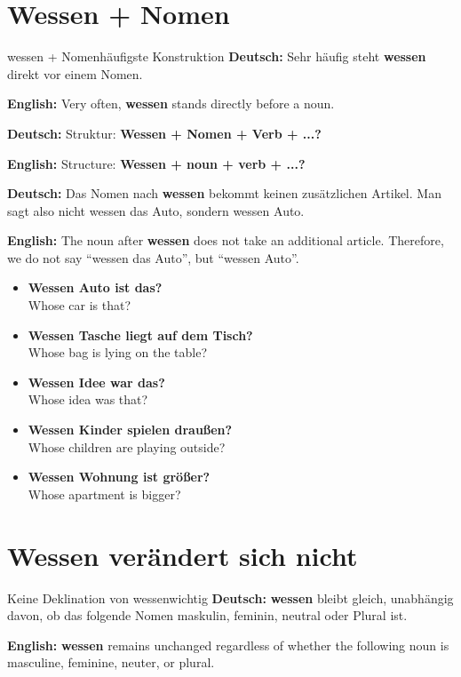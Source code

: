 \documentclass[a4paper,11pt]{article}
\newcommand{\GermanText}[1]{\textbf{Deutsch: }#1\par}
\newcommand{\EnglishText}[1]{{\small\color{SoftGray}\textbf{English: }#1\par}}
\newcommand{\ExampleItem}[2]{\item \textbf{#1}\\{\small\color{SoftGray}#2}}
\begin{document}
    
    \section{Wessen + Nomen}
        
        \begin{grammarentry}{wessen + Nomen}{häufigste Konstruktion}
            \GermanText{Sehr häufig steht \textbf{wessen} direkt vor einem Nomen.}
            \EnglishText{Very often, \textbf{wessen} stands directly before a noun.}
            
            \GermanText{Struktur: \textbf{Wessen + Nomen + Verb + ...?}}
            \EnglishText{Structure: \textbf{Wessen + noun + verb + ...?}}
            
            \GermanText{Das Nomen nach \textbf{wessen} bekommt keinen zusätzlichen Artikel. Man sagt also nicht \glqq wessen das Auto\grqq, sondern \glqq wessen Auto\grqq.}
            \EnglishText{The noun after \textbf{wessen} does not take an additional article. Therefore, we do not say ``wessen das Auto'', but ``wessen Auto''.}
        \end{grammarentry}
        
        \begin{exbox}
            \begin{itemize}
                \ExampleItem{Wessen Auto ist das?}{Whose car is that?}
                \ExampleItem{Wessen Tasche liegt auf dem Tisch?}{Whose bag is lying on the table?}
                \ExampleItem{Wessen Idee war das?}{Whose idea was that?}
                \ExampleItem{Wessen Kinder spielen draußen?}{Whose children are playing outside?}
                \ExampleItem{Wessen Wohnung ist größer?}{Whose apartment is bigger?}
            \end{itemize}
        \end{exbox}
    
    
    \section{Wessen verändert sich nicht}
        
        \begin{grammarentry}{Keine Deklination von wessen}{wichtig}
            \GermanText{\textbf{wessen} bleibt gleich, unabhängig davon, ob das folgende Nomen maskulin, feminin, neutral oder Plural ist.}
            \EnglishText{\textbf{wessen} remains unchanged regardless of whether the following noun is masculine, feminine, neuter, or plural.}
        \end{grammarentry}
        
\end{document}

